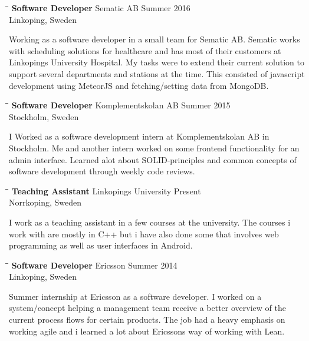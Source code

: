 \documentclass{res}
\begin{document}
\begin{resume}
   \begin{tabbing}
   \hspace{2.3in}\= \hspace{2.6in}\= \kill %
    {\bf Software Developer} \>Sematic AB     \>Summer 2016\\
                             \>Linkoping, Sweden
   \end{tabbing}\vspace{-20pt}      %
   Working as a software developer in a small team for Sematic AB. Sematic works with scheduling solutions for healthcare and has most of their customers at Linkopings University Hospital. My tasks were to extend their current solution to support several departments and stations at the time. This consisted of javascript development using MeteorJS and fetching/setting data from MongoDB.
   \begin{tabbing}
   \hspace{2.3in}\= \hspace{2.6in}\= \kill %
    {\bf Software Developer} \>Komplementskolan AB     \>Summer 2015\\
                             \>Stockholm, Sweden
   \end{tabbing}\vspace{-20pt}      %
    I Worked as a software development intern at Komplementskolan AB in Stockholm. Me and another intern worked on some frontend functionality for an admin interface. Learned alot about SOLID-principles and common concepts of software development through weekly code reviews.

     \begin{tabbing}
   \hspace{2.3in}\= \hspace{2.6in}\= \kill %
    {\bf Teaching Assistant} \>Linkopings University     \>Present\\
                             \>Norrkoping, Sweden
   \end{tabbing}\vspace{-20pt}      %
    I work as a teaching assistant in a few courses at the university. The courses i work with are mostly in C++ but i have also done some that involves web programming as well as user interfaces in Android.


   \begin{tabbing}
   \hspace{2.3in}\= \hspace{2.6in}\= \kill %
    {\bf Software Developer} \>Ericsson     \>Summer 2014\\
                             \>Linkoping, Sweden
   \end{tabbing}\vspace{-20pt}      %
    Summer internship at Ericsson as a software developer. I worked on a system/concept helping a management team receive a better overview of the current process flows for certain products. The job had a heavy emphasis on working agile and i learned a lot about Ericssons way of working with Lean.


\end{resume}
\end{document}
